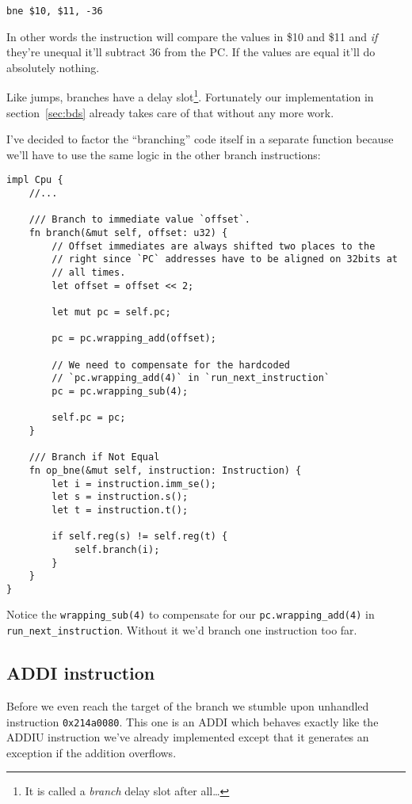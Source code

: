 \documentclass[a4paper]{article}
\newcommand{\code}[1] {\texttt{#1}}
\begin{document}
\begin{lstlisting}[language=assembly]
bne $10, $11, -36
\end{lstlisting}

In other words the instruction will compare the values in \$10 and
\$11 and \emph{if} they're unequal it'll subtract 36 from the
PC. If the values are equal it'll do absolutely nothing.

Like jumps, branches have a delay slot\footnote{It is called a
  \emph{branch} delay slot after all\dots}. Fortunately our
implementation in section~\ref{sec:bds} already takes care of that
without any more work.

I've decided to factor the ``branching'' code itself in a separate
function because we'll have to use the same logic in the other branch
instructions:

\begin{lstlisting}
impl Cpu {
    //...

    /// Branch to immediate value `offset`.
    fn branch(&mut self, offset: u32) {
        // Offset immediates are always shifted two places to the
        // right since `PC` addresses have to be aligned on 32bits at
        // all times.
        let offset = offset << 2;

        let mut pc = self.pc;

        pc = pc.wrapping_add(offset);

        // We need to compensate for the hardcoded
        // `pc.wrapping_add(4)` in `run_next_instruction`
        pc = pc.wrapping_sub(4);

        self.pc = pc;
    }

    /// Branch if Not Equal
    fn op_bne(&mut self, instruction: Instruction) {
        let i = instruction.imm_se();
        let s = instruction.s();
        let t = instruction.t();

        if self.reg(s) != self.reg(t) {
            self.branch(i);
        }
    }
}
\end{lstlisting}

Notice the \code{wrapping\_sub(4)} to compensate for our
\code{pc.wrapping\_add(4)} in
\code{run\_next\_instruction}. Without it we'd branch one
instruction too far.

\subsection{ADDI instruction}

Before we even reach the target of the branch we stumble upon
unhandled instruction \code{0x214a0080}. This one is an ADDI which
behaves exactly like the ADDIU instruction we've already implemented
except that it generates an exception if the addition overflows.
\end{document}
